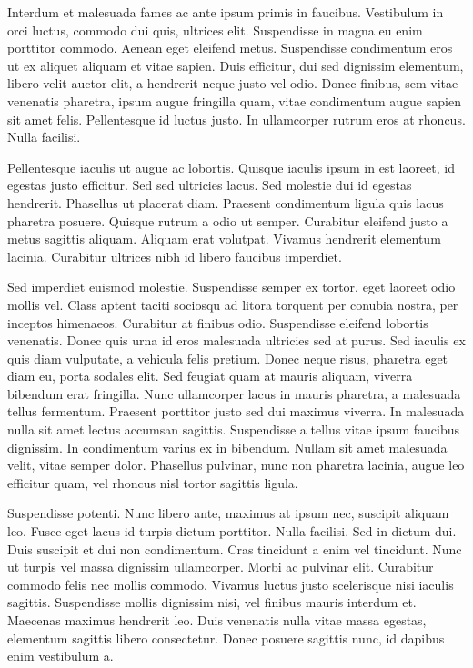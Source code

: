 Interdum et malesuada fames ac ante ipsum primis in faucibus. Vestibulum in orci luctus, commodo dui quis, ultrices elit. Suspendisse in magna eu enim porttitor commodo. Aenean eget eleifend metus. Suspendisse condimentum eros ut ex aliquet aliquam et vitae sapien. Duis efficitur, dui sed dignissim elementum, libero velit auctor elit, a hendrerit neque justo vel odio. Donec finibus, sem vitae venenatis pharetra, ipsum augue fringilla quam, vitae condimentum augue sapien sit amet felis. Pellentesque id luctus justo. In ullamcorper rutrum eros at rhoncus. Nulla facilisi.

Pellentesque iaculis ut augue ac lobortis. Quisque iaculis ipsum in est laoreet, id egestas justo efficitur. Sed sed ultricies lacus. Sed molestie dui id egestas hendrerit. Phasellus ut placerat diam. Praesent condimentum ligula quis lacus pharetra posuere. Quisque rutrum a odio ut semper. Curabitur eleifend justo a metus sagittis aliquam. Aliquam erat volutpat. Vivamus hendrerit elementum lacinia. Curabitur ultrices nibh id libero faucibus imperdiet.

Sed imperdiet euismod molestie. Suspendisse semper ex tortor, eget laoreet odio mollis vel. Class aptent taciti sociosqu ad litora torquent per conubia nostra, per inceptos himenaeos. Curabitur at finibus odio. Suspendisse eleifend lobortis venenatis. Donec quis urna id eros malesuada ultricies sed at purus. Sed iaculis ex quis diam vulputate, a vehicula felis pretium. Donec neque risus, pharetra eget diam eu, porta sodales elit. Sed feugiat quam at mauris aliquam, viverra bibendum erat fringilla. Nunc ullamcorper lacus in mauris pharetra, a malesuada tellus fermentum. Praesent porttitor justo sed dui maximus viverra. In malesuada nulla sit amet lectus accumsan sagittis. Suspendisse a tellus vitae ipsum faucibus dignissim. In condimentum varius ex in bibendum. Nullam sit amet malesuada velit, vitae semper dolor. Phasellus pulvinar, nunc non pharetra lacinia, augue leo efficitur quam, vel rhoncus nisl tortor sagittis ligula.

Suspendisse potenti. Nunc libero ante, maximus at ipsum nec, suscipit aliquam leo. Fusce eget lacus id turpis dictum porttitor. Nulla facilisi. Sed in dictum dui. Duis suscipit et dui non condimentum. Cras tincidunt a enim vel tincidunt. Nunc ut turpis vel massa dignissim ullamcorper. Morbi ac pulvinar elit. Curabitur commodo felis nec mollis commodo. Vivamus luctus justo scelerisque nisi iaculis sagittis. Suspendisse mollis dignissim nisi, vel finibus mauris interdum et. Maecenas maximus hendrerit leo. Duis venenatis nulla vitae massa egestas, elementum sagittis libero consectetur. Donec posuere sagittis nunc, id dapibus enim vestibulum a.

